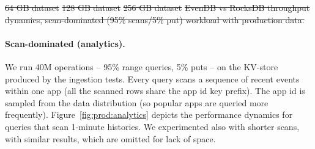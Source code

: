 \documentclass[sigplan,10pt]{acmart}
\newcommand{\sys}{EvenDB}
\providecommand{\DIFdel}[1]{{\protect\color{red}\sout{#1}}}                      %
\providecommand{\DIFdelbegin}{} %
\providecommand{\DIFdelend}{} %
\providecommand{\DIFdelFL}[1]{\DIFdel{#1}} %
\begin{document}
\DIFdelbegin %
{%
\DIFdelFL{64 GB dataset}}
{%
\DIFdelFL{128 GB dataset}}
{%
\DIFdelFL{256 GB dataset}}
{%
\DIFdelFL{\sys\/ vs RocksDB throughput dynamics,  scan-dominated (95\% scans/5\% put) workload with production data.}}

\DIFdelend \paragraph{Scan-dominated (analytics).} We run 40M operations -- 95\% range queries, 5\% puts -- 
on the KV-store produced by the ingestion tests.
Every query scans a sequence of recent events within one app (all the scanned rows 
share the  app id key prefix).  
The app id is sampled from the data distribution (so popular apps are queried more frequently).  
Figure~\ref{fig:prod:analytics} depicts the performance dynamics for queries that scan 1-minute histories.
We experimented also with shorter scans, with similar results, which are omitted for lack of space.
\end{document}
